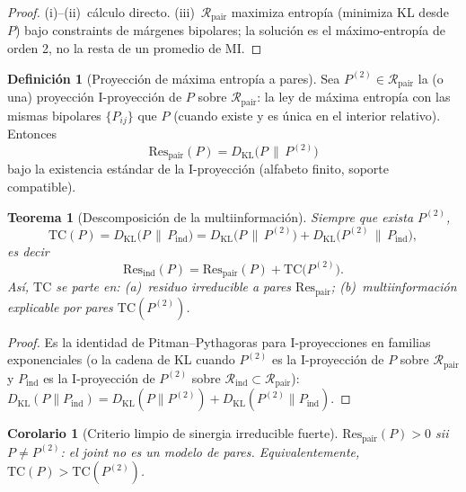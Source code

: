 \documentclass[11pt,a4paper]{article}
\theoremstyle{definition}
\newtheorem{definition}{Definici\'on}[section]
\theoremstyle{plain}
\newtheorem{theorem}{Teorema}[section]
\newtheorem{corollary}{Corolario}[section]
\theoremstyle{remark}
\newcommand{\Res}{\mathrm{Res}}
\newcommand{\TC}{\mathrm{TC}}
\newcommand{\Rind}{\mathcal{R}_{\mathrm{ind}}}
\newcommand{\Rpair}{\mathcal{R}_{\mathrm{pair}}}
\newcommand{\KL}{D_{\mathrm{KL}}}
\begin{document}
\begin{proof}
(i)--(ii)~c\'alculo directo. (iii)~$\Rpair$ maximiza entrop\'ia (minimiza
KL desde $P$) bajo constraints de m\'argenes bipolares; la soluci\'on es
el m\'aximo-entrop\'ia de orden 2, no la resta de un promedio de MI.
\end{proof}

\begin{definition}[Proyecci\'on de m\'axima entrop\'ia a pares]
\label{def:maxent2}
Sea $P^{(2)}\in\Rpair$ la (o una) proyecci\'on I-proyecci\'on de $P$ sobre
$\Rpair$: la ley de m\'axima entrop\'ia con las mismas bipolares
$\{P_{ij}\}$ que $P$ (cuando existe y es \'unica en el interior relativo).
Entonces
\begin{equation}
\label{eq:Res_pair_id}
\Res_{\mathrm{pair}}(P)=\KL\bigl(P\,\|\,P^{(2)}\bigr)
\end{equation}
bajo la existencia est\'andar de la I-proyecci\'on (alfabeto finito,
soporte compatible).
\end{definition}

\begin{theorem}[Descomposici\'on de la multiinformaci\'on]
\label{thm:decomp}
Siempre que exista $P^{(2)}$,
\begin{equation}
\label{eq:decomp}
\TC(P)
=\KL\bigl(P\,\|\,P_{\mathrm{ind}}\bigr)
=\KL\bigl(P\,\|\,P^{(2)}\bigr)
+\KL\bigl(P^{(2)}\,\|\,P_{\mathrm{ind}}\bigr),
\end{equation}
es decir
\begin{equation}
\Res_{\mathrm{ind}}(P)
=\Res_{\mathrm{pair}}(P)
+\TC\bigl(P^{(2)}\bigr).
\end{equation}
As\'i, $\TC$ se parte en: (a)~residuo irreducible a pares
$\Res_{\mathrm{pair}}$; (b)~multiinformaci\'on \emph{explicable por pares}
$\TC(P^{(2)})$.
\end{theorem}

\begin{proof}
Es la identidad de Pitman--Pythagoras para I-proyecciones en familias
exponenciales (o la cadena de KL cuando $P^{(2)}$ es la I-proyecci\'on de
$P$ sobre $\Rpair$ y $P_{\mathrm{ind}}$ es la I-proyecci\'on de $P^{(2)}$
sobre $\Rind\subset\Rpair$): 
$\KL(P\|P_{\mathrm{ind}})=\KL(P\|P^{(2)})+\KL(P^{(2)}\|P_{\mathrm{ind}})$.
\end{proof}

\begin{corollary}[Criterio limpio de sinergia irreducible fuerte]
\label{cor:strong}
$\Res_{\mathrm{pair}}(P)>0$ sii $P\ne P^{(2)}$: el joint no es un modelo de
pares. Equivalentemente, $\TC(P)>\TC(P^{(2)})$.
\end{corollary}
\end{document}
